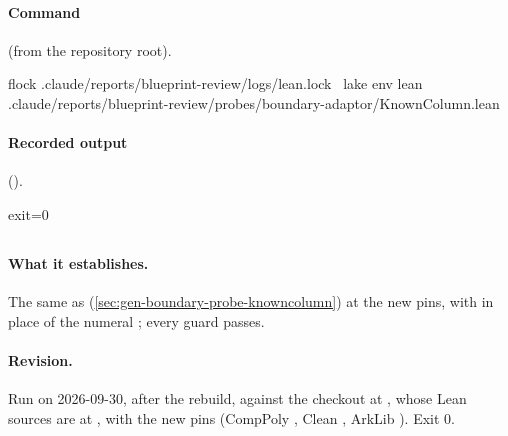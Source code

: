 \paragraph{Command} (from the repository root).
\begin{shellcode}
flock .claude/reports/blueprint-review/logs/lean.lock \
  lake env lean .claude/reports/blueprint-review/probes/boundary-adaptor/KnownColumn.lean
\end{shellcode}

\paragraph{Recorded output} ().
\begin{srccode}[numbers=left,numbersep=3pt]
exit=0
\end{srccode}

\subsection{\texorpdfstring{\protect{}}{KnownColumnNew}}\label{sec:gen-boundary-probe-knowncolumnnew}

\paragraph{What it establishes.} The same as 
(\cref{sec:gen-boundary-probe-knowncolumn}) at the new pins, with  in place of the
numeral \bndc{2}; every guard passes.

\paragraph{Revision.} Run on 2026-09-30, after the rebuild, against the checkout  at , whose Lean sources are  at , with the new pins (CompPoly , Clean , ArkLib ). Exit 0.

